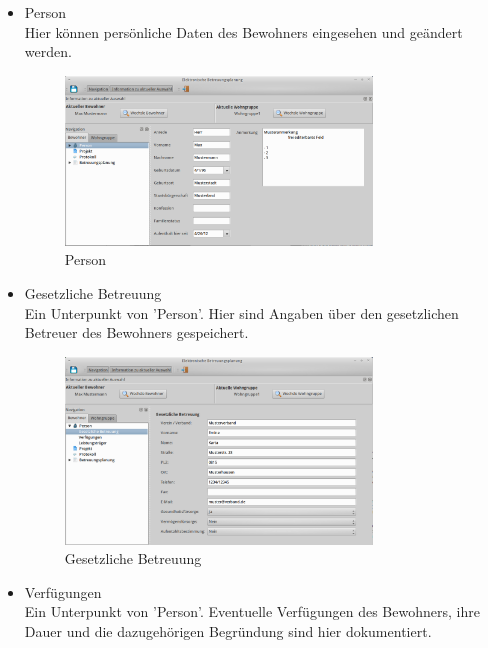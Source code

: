 \begin{itemize}
	\item Person\mbox{}\\
	\noindent
	Hier können persönliche Daten des Bewohners eingesehen und geändert werden.
	\begin{figure}[h]
		\begin{center}
			\includegraphics[keepaspectratio=true, width=0.77\textwidth]{pics/client_person.png}
			\caption{Person}
		\end{center}
	\end{figure}
	\FloatBarrier
	\item Gesetzliche Betreuung\mbox{}\\
	\noindent
	Ein Unterpunkt von 'Person'. Hier sind Angaben über den gesetzlichen Betreuer des Bewohners gespeichert.
	\begin{figure}[h]
		\begin{center}
			\includegraphics[keepaspectratio=true, width=0.77\textwidth]{pics/client_betreuung.png}
			\caption{Gesetzliche Betreuung}
		\end{center}
	\end{figure}
	\FloatBarrier
	\item Verfügungen\mbox{}\\
	\noindent
	Ein Unterpunkt von 'Person'. Eventuelle Verfügungen des Bewohners, ihre Dauer und die dazugehörigen Begründung sind hier dokumentiert.

\end{itemize}
